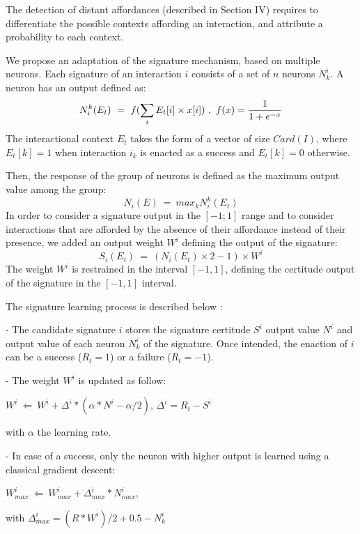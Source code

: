 \documentclass[conference]{IEEEtran}
\begin{document}
The detection of distant affordances (described in Section IV) requires to differentiate the possible contexts affording an interaction, and attribute a probability to each context.

We propose an adaptation of the signature mechanism, based on multiple neurons. Each signature of an interaction $i$ consists of a set of $n$ neurons $N_k^i$. A neuron has an output defined as:
\begin{equation}
N_i^k(E_t)~=~f(\sum_{i} E_t[i] \times x[i])~,~ f(x) = { {1}\over{1+e^{-x} }}
\end{equation}
The interactional context $E_t$ takes the form of a vector of size $Card(I)$, where $E_t[k]=1$ when interaction $i_k$ is enacted as a success and $E_t[k]=0$ otherwise.

Then, the response of the group of neurons is defined as the maximum output value among the group:
\begin{equation}
N_i(E)~=~max_k N_i^k(E_t)
\end{equation}
In order to consider a signature output in the $[-1;1]$ range and to consider interactions that are afforded by the absence of their affordance instead of their presence, we added an output weight $W^i$ defining the output of the signature:
\begin{equation}
S_i(E_t)~=~(N_i(E_t) \times 2 -1 ) \times W^i
\end{equation}
The weight $W^i$ is restrained in the interval $[-1,1]$, defining the certitude output of the signature in the $[-1,1]$ interval.

The signature learning process is described below :

- The candidate signature $i$ stores the signature certitude $S^i$ output value $N^i$ and output value of each neuron $N_k^i$ of the signature. Once intended, the enaction of $i$ can be a success ($R_t=1$) or a failure ($R_t=-1$).

- The weight $W^i$ is updated as follow:

$W^i ~\Leftarrow~ W^i+ \Delta^i * (\alpha * N^i - \alpha /2)$, $\Delta^i=R_t-S^i$

with $\alpha$ the learning rate.

- In case of a success, only the neuron with higher output is learned using a classical gradient descent:

$W_{max}^i ~\Leftarrow~ W_{max}^i+ \Delta_{max}^i * N_{max}^i$,

with $\Delta_{max}^i=(R*W^i)/2+0.5 - N_k^i$
\end{document}
